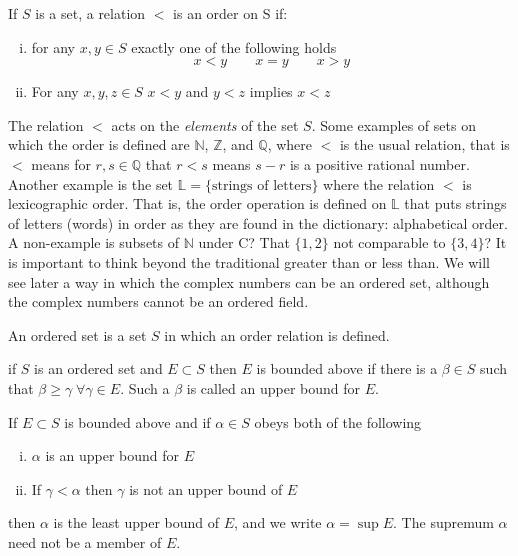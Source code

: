 \begin{defn-dan}
  If $S$ is a set, a relation $<$ is an order on S if:
  \begin{enumerate}[(i)]
    \item{for any $x,y\in S$ exactly one of the following holds}
  \begin{equation*}
  x<y \qquad x=y \qquad x>y
  \end{equation*}
    \item{For any $x,y,z\in S$ $x<y$ and $y<z$ implies $x<z$}
  \end{enumerate}
  The relation $<$ acts on the \textit{elements} of the set $S$.
  Some examples of sets on which the order is defined are $\mathbb{N}$, $\mathbb{Z}$, and $\mathbb{Q}$, where $<$ is the usual relation, that is $<$ means for $r,s\in\mathbb{Q}$ that $r<s$ means $s-r$ is a positive rational number.\\[6pt]
  Another example is the set $\mathbb{L}=\{\text{strings of letters}\}$ where the relation $<$ is lexicographic order.
  That is, the order operation is defined on $\mathbb{L}$ that puts strings of letters (words) in order as they are found in the dictionary: alphabetical order.\\[6pt]
  A non-example is subsets of $\mathbb{N}$ under C?\@
  That $\{1,2\}$ not comparable to $\{3,4\}$?
  It is important to think beyond the traditional greater than or less than.
  We will see later a way in which the complex numbers can be an ordered set, although the complex numbers cannot be an ordered field.
\end{defn-dan}

\begin{defn-dan}
  An ordered set is a set $S$ in which an order relation is defined.
\end{defn-dan}

\begin{defn-dan}
  if $S$ is an ordered set and $E\subset S$ then $E$ is bounded above if there is a $\beta\in S$ such that $\beta\geq\gamma\;\forall\gamma\in E$.
  Such a $\beta$ is called an upper bound for $E$.
\end{defn-dan}

\begin{defn-dan}
  If $E\subset S$ is bounded above and if $\alpha\in S$ obeys both of the following
  \begin{enumerate}[(i)]
    \item{$\alpha$ is an upper bound for $E$}
    \item{If $\gamma<\alpha$ then $\gamma$ is not an upper bound of $E$}
  \end{enumerate}
  then $\alpha$ is the least upper bound of $E$, and we write $\alpha=\sup E$.
  The supremum $\alpha$ need not be a member of $E$.
\end{defn-dan}

